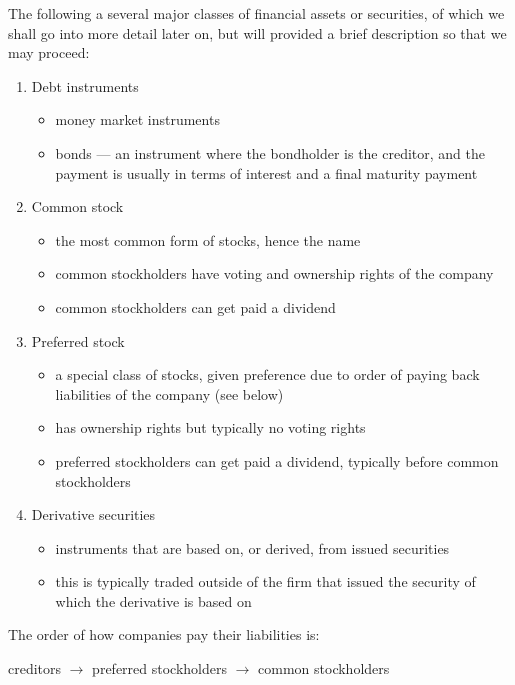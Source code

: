 \documentclass[notoc,notitlepage]{tufte-book}
\begin{document}
The following a several major classes of financial assets
or securities, of which we shall go into more detail later
on, but will provided a brief description so that we may proceed:
\begin{enumerate}
  \item Debt instruments
    \begin{itemize}
      \item money market instruments
      \item bonds --- an instrument where the bondholder is the creditor,
        and the payment is usually in terms of interest and a final
        maturity payment
    \end{itemize}
  \item Common stock
    \begin{itemize}
      \item the most common form of stocks, hence the name
      \item common stockholders have voting and ownership rights
        of the company
      \item common stockholders can get paid a dividend
    \end{itemize}
  \item Preferred stock
    \begin{itemize}
      \item a special class of stocks, given preference
        due to order of paying back liabilities of the company
        (see below)
      \item has ownership rights but typically no voting rights
      \item preferred stockholders can get paid a dividend,
        typically before common stockholders
    \end{itemize}
  \item Derivative securities
    \begin{itemize}
      \item instruments that are based on, or derived, from
        issued securities
      \item this is typically traded outside of the firm that
        issued the security of which the derivative is based on
    \end{itemize}
\end{enumerate}

The order of how companies pay their liabilities is:
\begin{center}
  creditors $\to$ preferred stockholders $\to$ common stockholders
\end{center}
\end{document}
